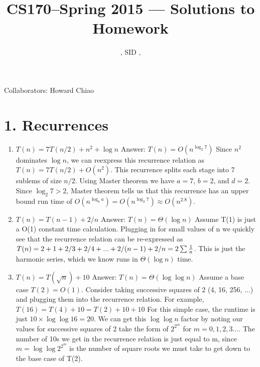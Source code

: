 \documentclass[11pt]{article}
\title{CS170--Spring 2015 --- Solutions to Homework \Homework}
\author{\Name, SID \SID, \texttt{\Login}}
\date{}
\newenvironment{qparts}{\begin{enumerate}[{(}a{)}]}{\end{enumerate}}
\begin{document}
\maketitle

Collaborators: Howard Chiao

\section*{1. Recurrences}
\begin{qparts}
\item
\begin{math}
T(n)=7T(n/2) + n^2 + \log n
\end{math}
\newline
Answer: $T(n) = O(n^{\log_2 7})$\newline
Since $n^2$ dominates $\log n$, we can reexpress this recurrence relation as $
T(n)=7T(n/2) + O(n^2)$. This recurrence splits each stage into 7 sublems of size $n/2$. Using Master theorem we have $a=7$, $b=2$, and $d=2$. Since $\log_2 7 > 2$, Master theorem tells us that this recurrence has an upper bound run time of $O(n^{\log_b a}) = O(n^{\log_2 7}) \approx O(n^{2.8})$.
\item
$T(n)=T(n-1) + 2/n$\newline
Answer: $T(n) = \Theta(\log n)$\newline
Assume T(1) is just a O(1) constant time calculation. Plugging in for small values of n we quickly see that the recurrence relation can be re-expressed as $T(n)=2 + 1 + 2/3 + 2/4 + ... + 2/(n-1) + 2/n = 2 \sum{1\over n}$. This is just the harmonic series, which we know runs in $\Theta(\log n)$ time.\newline


\item
$T(n)=T(\sqrt{n}) + 10$\newline
Answer: $T(n)=\Theta(\log \log n)$\newline
Assume a base case $T(2) = O(1)$. Consider taking successive squares of 2 (4, 16, 256, ...) and plugging them into the recurrence relation. For example, $T(16) = T(4) + 10 = T(2)+10+10$ For this simple case, the runtime is just $10\times \log \log16 = 20$. We can get this $\log\log n$ factor by noting our values for successive squares of 2 take the form of $2^{2^m}$ for $m = 0,1,2,3...$. The number of 10s we get in the recurrence relation is just equal to m, since $m = \log \log 2^{2^m}$ is the number of square roots we must take to get down to the base case of T(2).

\end{qparts}
\end{document}
